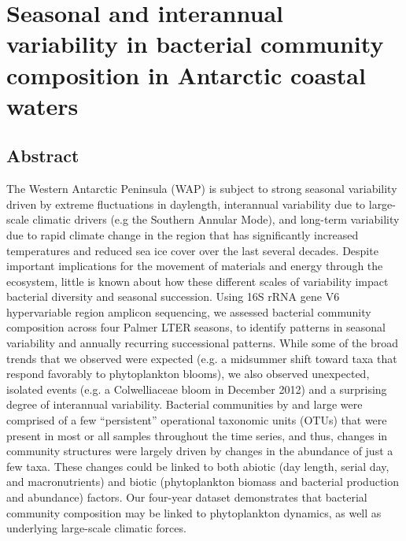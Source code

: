 \chapter{Seasonal and interannual variability in bacterial community composition in Antarctic coastal waters}\label{ch:lter}




\section{Abstract}

The Western Antarctic Peninsula (WAP) is subject to strong seasonal variability driven by extreme fluctuations in daylength, interannual variability due to large-scale climatic drivers (e.g the Southern Annular Mode), and long-term variability due to rapid climate change in the region that has significantly increased temperatures and reduced sea ice cover over the last several decades. Despite important implications for the movement of materials and energy through the ecosystem, little is known about how these different scales of variability impact bacterial diversity and seasonal succession. Using 16S rRNA gene V6 hypervariable region amplicon sequencing, we assessed bacterial community composition across four Palmer LTER seasons, to identify patterns in seasonal variability and annually recurring successional patterns. While some of the broad trends that we observed were expected (e.g. a midsummer shift toward taxa that respond favorably to phytoplankton blooms), we also observed unexpected, isolated events (e.g. a Colwelliaceae bloom in December 2012) and a surprising degree of interannual variability. Bacterial communities by and large were comprised of a few ``persistent'' operational taxonomic units (OTUs) that were present in most or all samples throughout the time series, and thus, changes in community structures were largely driven by changes in the abundance of just a few taxa. These changes could be linked to both abiotic (day length, serial day, and macronutrients) and biotic (phytoplankton biomass and bacterial production and abundance) factors. Our four-year dataset demonstrates that bacterial community composition may be linked to phytoplankton dynamics, as well as underlying large-scale climatic forces.

